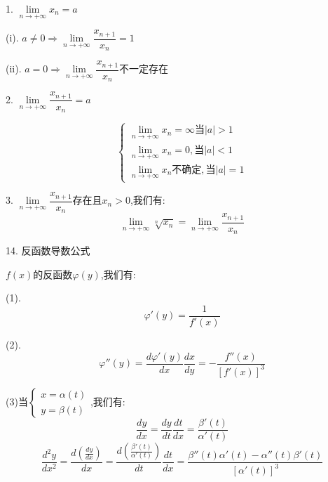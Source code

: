 \begin{theorem}[极限推论]
	1. $\lim\limits_{n\rightarrow +\infty}x_{n}=a$
	
	(i). $a\neq 0\Rightarrow \lim\limits_{n\rightarrow +\infty}\dfrac{x_{n+1}}{x_{n}}=1$
	
	(ii). $a=0\Rightarrow \lim\limits_{n\rightarrow +\infty}\dfrac{x_{n+1}}{x_{n}} \text{不一定存在}$
	
	2. $\lim\limits_{n\rightarrow +\infty}\dfrac{x_{n+1}}{x_{n}}=a$
	
	$$\left\lbrace 
	\begin{array}{l}
		\lim\limits_{n\rightarrow +\infty}x_{n}=\infty \text{当}|a|>1\\
		\lim\limits_{n\rightarrow +\infty}x_{n}=0,\text{当}|a|<1\\
		\lim\limits_{n\rightarrow +\infty}x_{n}\text{不确定},\text{当}|a|=1
	\end{array}
	\right. $$
	
	3. $\lim\limits_{n\rightarrow +\infty}\dfrac{x_{n+1}}{x_{n}}\text{存在且}x_{n}>0$,我们有:  
	$$\lim\limits_{n\rightarrow +\infty}\sqrt[n]{x_{n}}=\lim\limits_{n\rightarrow +\infty}\dfrac{x_{n+1}}{x_{n}}$$
\end{theorem}

14. 反函数导数公式
\begin{theorem}[反函数导数公式]\label{the: 反函数导数公式}
	$f(x)$的反函数$\varphi(y)$,我们有:  
	
	(1). $$\varphi'(y)=\dfrac{1}{f'(x)}$$
	
	(2). $$\varphi''(y)=\dfrac{d\varphi'(y)}{dx}\dfrac{dx}{dy}=-\dfrac{f''(x)}{[f'(x)]^3}$$
	
	(3)当$\left\lbrace 
	\begin{array}{l}
		x=\alpha(t)\\
		y=\beta(t)
	\end{array}
	\right. $,我们有:  
	$$\dfrac{dy}{dx}=\dfrac{dy}{dt}\dfrac{dt}{dx}=\dfrac{\beta'(t)}{\alpha'(t)}$$
	$$\dfrac{d^2y}{dx^2}=\dfrac{d(\frac{dy}{dx})}{dx}=\dfrac{d(\frac{\beta'(t)}{\alpha'(t)})}{dt}\dfrac{dt}{dx}=\dfrac{\beta''(t)\alpha'(t)-\alpha''(t)\beta'(t)}{[\alpha'(t)]^3}$$
\end{theorem}

